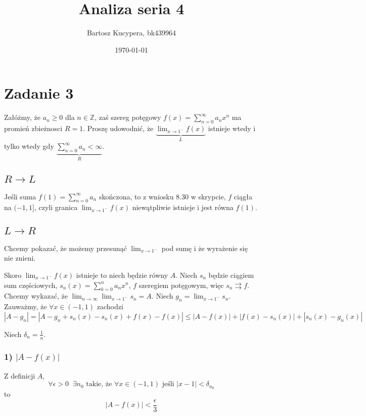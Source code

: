 \documentclass{article}
\title{Analiza seria 4}
\author{Bartosz Kucypera, bk439964}
\date{\today}
\begin{document}
\maketitle

\section*{Zadanie 3} 
Załóżmy, że $a_n \ge 0$ dla $n\in \mathbb{Z}$, zaś szereg potęgowy $f(x) = \sum_{n=0}^{\infty}a_nx^n$ ma promień zbieżnosci $R=1$. Proszę udowodnić, że $\underbrace{\lim_{x \to 1^-}f(x)}_L$ istnieje wtedy i tylko wtedy gdy $\underbrace{\sum_{n=0}^{\infty}a_n < \infty}_R$.

\subsection*{$R \to L$}
Jeśli suma $f(1) = \sum_{n=0}^{\infty}a_n$ skończona, to z wniosku 8.30 w skrypcie, $f$ ciągła na $(-1,1]$, czyli granica $\lim_{x \to 1^-}f(x)$ niewątpliwie istnieje i jest równa $f(1)$.

\subsection*{$L \to R$}
Chcemy pokazać, że możemy przesunąć $\lim_{x \to 1^-}$ pod sumę i że wyrażenie się nie znieni. \newline

Skoro $\displaystyle \lim_{x\to 1^-}f(x)$ istnieje to niech będzie równy $A$. \newline
Niech $s_n$ będzie ciągiem sum częściowych, $s_n(x) = \sum_{k=0}^{n}a_nx^n$,
$f$ szeregiem potęgowym, więc $s_n \rightrightarrows f$. \newline
Chcemy wykazać, że $\displaystyle \lim_{n\to \infty} \lim_{x \to 1^-}s_n = A$. \newline
Niech $\displaystyle g_n = \lim_{x\to 1^-}s_n$. Zauważmy, że $\forall x \in (-1,1)$ zachodzi
$$|A-g_n| = |A - g_n + s_n(x) - s_n(x) + f(x) - f(x)| \le |A-f(x)| + |f(x)-s_n(x)| + |s_n(x)-g_n(x)| $$

Niech $\delta_n = \frac{1}{n}$.
\subsubsection*{1) $|A-f(x)|$}
Z definicji $A$, $$\displaystyle \forall \epsilon>0 \; \; \exists n_0 \mbox{ takie, że } \forall x \in (-1,1) \mbox{ jeśli } |x-1|<\delta_{n_0}$$
to 
$$|A-f(x)| < \frac{\epsilon}{3} $$
\end{document}
